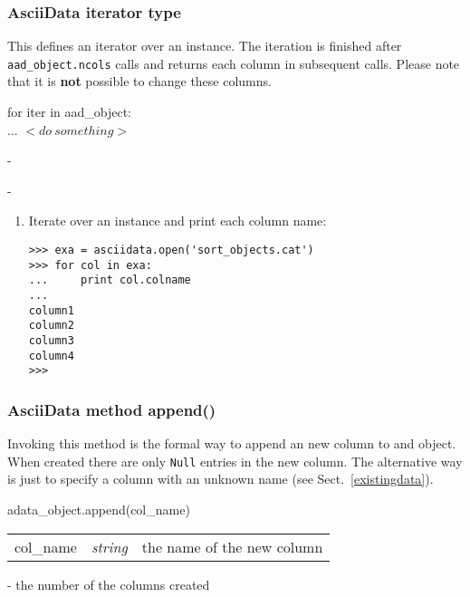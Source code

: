 \subsubsection{AsciiData iterator type}
\label{adm_iterator}
%
This defines an iterator over an \ad instance. The iteration is finished after
{\tt aad\_object.ncols} calls and returns each column in subsequent calls.
Please note that it is {\bf not} possible to change these columns.

for iter in aad\_object:\\
... $<do\ something>$

-

-

\begin{enumerate}
\item Iterate over an \ad instance and print each column name:
\begin{small}
\begin{verbatim}
>>> exa = asciidata.open('sort_objects.cat')
>>> for col in exa:
...     print col.colname
...
column1
column2
column3
column4
>>>
\end{verbatim}
\end{small}
\end{enumerate}


\subsubsection{AsciiData method append()}
\label{adm_append}
Invoking this method is the formal way to append an new column
to and \ad object. When created there are only {\tt Null} entries in the
new column. The alternative way is just to specify a column
with an unknown name (see Sect.\ \ref{existingdata}).

adata\_object.append(col\_name)

\begin{tabular}{lcl}
col\_name &{\it string}& the name of the new column\\
\end{tabular}

- the number of the columns created

